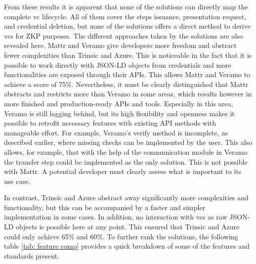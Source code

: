     From these results it is apparent that none of the solutions can directly map the complete \ac{vc} lifecycle. All of them cover the steps issuance, presentation request, and credential deletion, but none of the solutions offers a direct method to derive \acp{vc} for \ac{ZKP} purposes. The different approaches taken by the solutions are also revealed here. Mattr and Veramo give developers more freedom and abstract fewer complexities than Trinsic and Azure. This is noticeable in the fact that it is possible to work directly with JSON-LD objects from credentials and more functionalities are exposed through their APIs. This allows Mattr and Veramo to achieve a score of 75\%. Nevertheless, it must be clearly distinguished that Mattr abstracts and restricts more than Veramo in some areas, which results however in more finished and production-ready APIs and tools. Especially in this area, Veramo is still lagging behind, but its high flexibility and openness makes it possible to retrofit necessary features with existing API methods with manageable effort. For example, Veramo's verify method is incomplete, as described earlier, where missing checks can be implemented by the user. This also allows, for example, that with the help of the communication module in Veramo the transfer step could be implemented as the only solution. This is not possible with Mattr. A potential developer must clearly assess what is important to its use case.
    
    In contrast, Trinsic and Azure abstract away significantly more complexities and functionality, but this can be accompanied by a faster and simpler implementation in some cases. In addition, no interaction with \acp{vc} as raw JSON-LD objects is possible here at any point. This ensured that Trinsic and Azure could only achieve 65\% and 60\%. To further rank the solutions, the following table \ref{tab: feature comp} provides a quick breakdown of some of the features and standards present.

